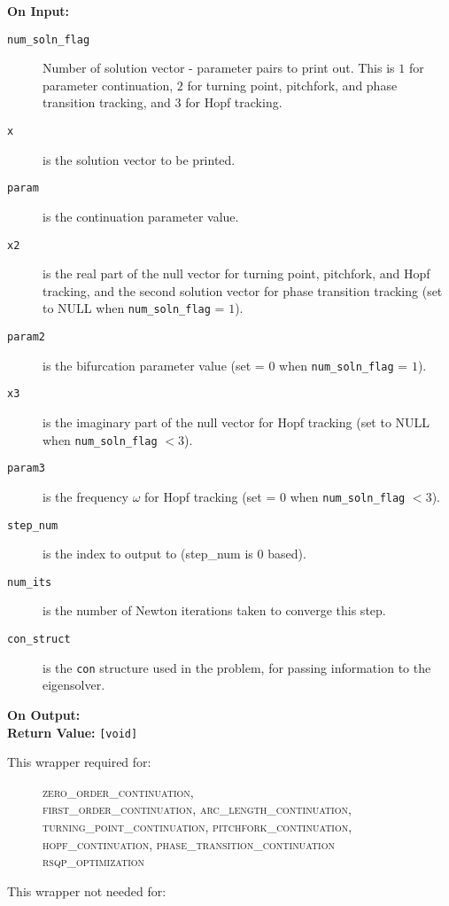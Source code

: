 {\bf On Input:}
\begin{description}
\item[\texttt{num\_soln\_flag}] Number of solution vector - parameter pairs to print out. This is $1$ for parameter continuation, $2$ for turning point, pitchfork, and phase transition tracking, and $3$ for Hopf tracking.
\item[\texttt{x}]  is the solution vector to be printed.
\item[\texttt{param}] is the continuation parameter value.
\item[\texttt{x2}]  is the real part of the null vector for turning point, pitchfork, and Hopf tracking, and the second solution vector for phase transition tracking (set to NULL when \texttt{num\_soln\_flag} = $1$).
\item[\texttt{param2}] is the bifurcation parameter value (set = $0$ when \texttt{num\_soln\_flag} = $1$).
\item[\texttt{x3}]  is the imaginary part of the null vector for Hopf tracking (set to NULL when \texttt{num\_soln\_flag} $< 3$).
\item[\texttt{param3}] is the frequency $\omega$ for Hopf tracking (set = $0$ when \texttt{num\_soln\_flag} $< 3$).
\item[\texttt{step\_num}] is the index to output to (step\_num is 0 based).
\item[\texttt{num\_its}]  is the number of Newton iterations taken to converge this step.
\item[\texttt{con\_struct}]  is the \texttt{con} structure used in the problem, for passing information to the eigensolver.
\end{description}

{\bf On Output:} \\

{\bf Return Value:} \texttt{[void]} 

\begin{description}
\item[This wrapper required for:] 
\textsc{zero\_order\_continuation, \\ first\_order\_continuation, arc\_length\_continuation, \\ turning\_point\_continuation, pitchfork\_continuation, \\
hopf\_continuation, phase\_transition\_continuation \\
rsqp\_optimization}
\item[This wrapper not needed for:]
\textsc{}
\end{description}
